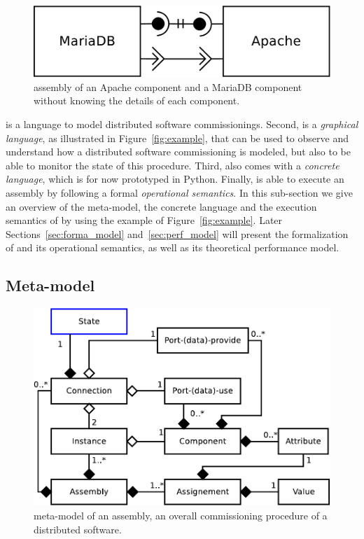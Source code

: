 \begin{figure}[tbp]
  \begin{center}
    \includegraphics[width=0.6\linewidth]{./images/simpleass.pdf}
  \end{center}
  \caption{\mad assembly of an Apache component and a MariaDB
    component without knowing the details of each component.}
  \label{fig:simple}
\end{figure}

\mad is a language to model distributed software commissionings.
Second, \mad is a
\emph{graphical language}, as illustrated in Figure~\ref{fig:example},
that can be used to observe and understand how a distributed software
commissioning is modeled, but also to be able to monitor the state of
this procedure. Third, \mad also comes with a \emph{concrete
  language}, which is for now prototyped in Python. Finally, \mad is
able to execute an assembly by following a formal \emph{operational
  semantics}. In this sub-section we give an overview of the
meta-model, the concrete language and the execution semantics of
\mad by using the example of Figure~\ref{fig:example}. Later
Sections~\ref{sec:forma_model} and~\ref{sec:perf_model} will present
the formalization of \mad and its operational semantics, as well as
its theoretical performance model.

\subsection{Meta-model}


\begin{figure}[tbp]
  \begin{center}
    \includegraphics[width=0.9\linewidth]{./images/ass_uml.pdf}
  \end{center}
  \caption{\mad meta-model of an assembly, \ie an overall
    commissioning procedure of a distributed software.}
  \label{fig:mmass}
\end{figure}

